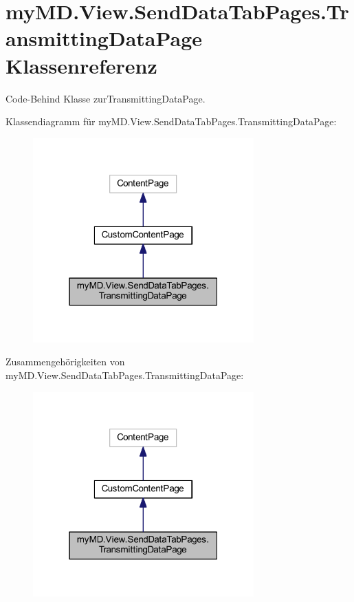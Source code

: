 \hypertarget{classmy_m_d_1_1_view_1_1_send_data_tab_pages_1_1_transmitting_data_page}{}\section{my\+M\+D.\+View.\+Send\+Data\+Tab\+Pages.\+Transmitting\+Data\+Page Klassenreferenz}
\label{classmy_m_d_1_1_view_1_1_send_data_tab_pages_1_1_transmitting_data_page}


Code-\/\+Behind Klasse zur\+Transmitting\+Data\+Page.  




Klassendiagramm für my\+M\+D.\+View.\+Send\+Data\+Tab\+Pages.\+Transmitting\+Data\+Page\+:\nopagebreak
\begin{figure}[H]
\begin{center}
\leavevmode
\includegraphics[width=241pt]{classmy_m_d_1_1_view_1_1_send_data_tab_pages_1_1_transmitting_data_page__inherit__graph}
\end{center}
\end{figure}


Zusammengehörigkeiten von my\+M\+D.\+View.\+Send\+Data\+Tab\+Pages.\+Transmitting\+Data\+Page\+:\nopagebreak
\begin{figure}[H]
\begin{center}
\leavevmode
\includegraphics[width=241pt]{classmy_m_d_1_1_view_1_1_send_data_tab_pages_1_1_transmitting_data_page__coll__graph}
\end{center}
\end{figure}
